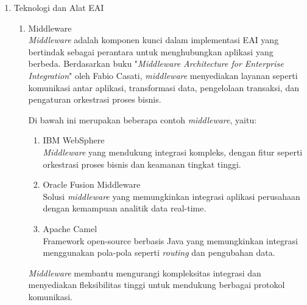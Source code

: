 \begin{enumerate}[label*=\arabic*.,ref=\arabic*]
    \item Teknologi dan Alat EAI
        \begin{enumerate}[label=\alph*.]
            \item Middleware\\
            \textit{Middleware} adalah komponen kunci dalam implementasi EAI yang bertindak sebagai perantara untuk menghubungkan aplikasi yang berbeda. Berdasarkan buku "\textit{Middleware Architecture for Enterprise Integration}" oleh Fabio Casati, \textit{middleware} menyediakan layanan seperti komunikasi antar aplikasi, transformasi data, pengelolaan transaksi, dan pengaturan orkestrasi proses bisnis.

            Di bawah ini merupakan beberapa contoh \textit{middleware}, yaitu:
            \begin{enumerate}[label=\alph*.]
                \item IBM WebSphere\\ 
               \textit{Middleware} yang mendukung integrasi kompleks, dengan fitur seperti orkestrasi proses bisnis dan keamanan tingkat tinggi.
                \item Oracle Fusion Middleware\\
                Solusi \textit{middleware} yang memungkinkan integrasi aplikasi perusahaan dengan kemampuan analitik data real-time.
                \item Apache Camel \\ 
                Framework open-source berbasis Java yang memungkinkan integrasi menggunakan pola-pola seperti \textit{routing} dan pengubahan data.
            \end{enumerate}
            
            \textit{Middleware} membantu mengurangi kompleksitas integrasi dan menyediakan fleksibilitas tinggi untuk mendukung berbagai protokol komunikasi.


\end{enumerate}
\end{enumerate}
